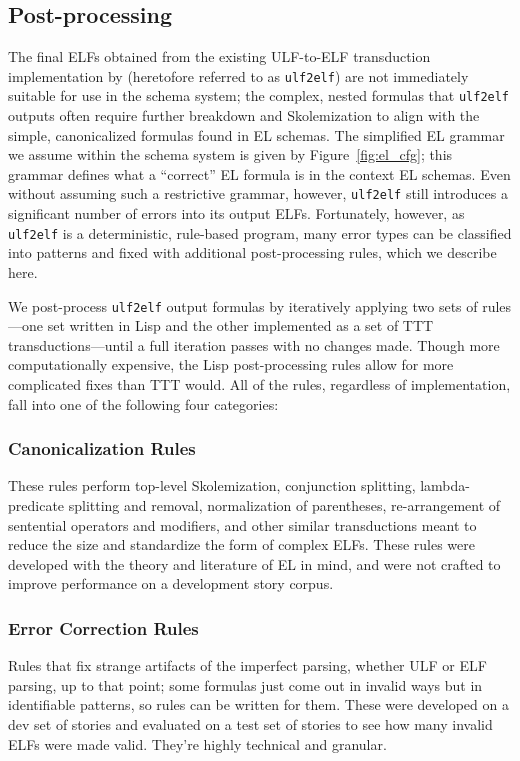 \subsection{Post-processing}
The final ELFs obtained from the existing ULF-to-ELF transduction implementation by \citet{schubert-2014-treebank} (heretofore referred to as \texttt{ulf2elf}) are not immediately suitable for use in the schema system; the complex, nested formulas that \texttt{ulf2elf} outputs often require further breakdown and Skolemization to align with the simple, canonicalized formulas found in EL schemas. The simplified EL grammar we assume within the schema system is given by Figure~\ref{fig:el_cfg}; this grammar defines what a ``correct'' EL formula is in the context EL schemas. Even without assuming such a restrictive grammar, however, \texttt{ulf2elf} still introduces a significant number of errors into its output ELFs. Fortunately, however, as \texttt{ulf2elf} is a deterministic, rule-based program, many error types can be classified into patterns and fixed with additional post-processing rules, which we describe here.

We post-process \texttt{ulf2elf} output formulas by iteratively applying two sets of rules---one set written in Lisp and the other implemented as a set of TTT transductions---until a full iteration passes with no changes made. Though more computationally expensive, the Lisp post-processing rules allow for more complicated fixes than TTT would. All of the rules, regardless of implementation, fall into one of the following four categories:

\subsubsection{Canonicalization Rules}
These rules perform top-level Skolemization, conjunction splitting, lambda-predicate splitting and removal, normalization of parentheses, re-arrangement of sentential operators and modifiers, and other similar transductions meant to reduce the size and standardize the form of complex ELFs. These rules were developed with the theory and literature of EL in mind, and were not crafted to improve performance on a development story corpus.

\subsubsection{Error Correction Rules}
Rules that fix strange artifacts of the imperfect parsing, whether ULF or ELF parsing, up to that point; some formulas just come out in invalid ways but in identifiable patterns, so rules can be written for them. These were developed on a dev set of stories and evaluated on a test set of stories to see how many invalid ELFs were made valid. They're highly technical and granular.

